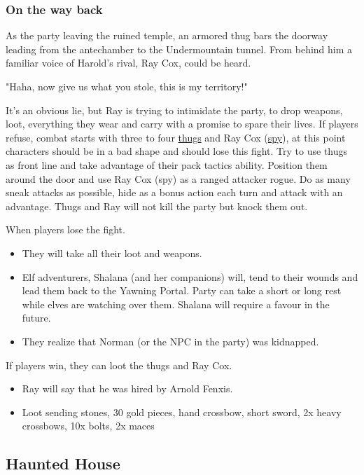 \documentclass[10pt,onecolumn,twoside,openany,bg=full,layout=true]{dndbook}
\begin{document}
\subsubsection{On the way back}
As the party leaving the ruined temple, an armored thug bars the doorway leading from the antechamber to the Undermountain tunnel.
From behind him a familiar voice of Harold's rival, Ray Cox, could be heard.
\begin{DndReadAloud}
"Haha, now give us what you stole, this is my territory!"
\end{DndReadAloud}
It's an obvious lie, but Ray is trying to intimidate the party, to drop weapons, loot, everything they wear and carry with a promise to spare their lives.
If players refuse, combat starts with three to four \href{https://www.dndbeyond.com/monsters/17035-thug}{thugs} and
Ray Cox (\href{https://www.dndbeyond.com/monsters/17021-spy}{spy}), at this point characters should be in a bad shape and should lose this fight.
Try to use thugs as front line and take advantage of their pack tactics ability.
Position them around the door and use Ray Cox (spy) as a ranged attacker rogue.
Do as many sneak attacks as possible, hide as a bonus action each turn and attack with an advantage.
Thugs and Ray will not kill the party but knock them out.

When players lose the fight.
\begin{itemize}
  \item They will take all their loot and weapons.
  \item Elf adventurers, Shalana (and her companions) will, tend to their wounds and lead them back to the Yawning Portal.
  Party can take a short or long rest while elves are watching over them.
  Shalana will require a favour in the future.
  \item They realize that Norman (or the NPC in the party) was kidnapped.
\end{itemize}

If players win, they can loot the thugs and Ray Cox.
\begin{itemize}
  \item Ray will say that he was hired by Arnold Fenxis.
  \item Loot sending stones, 30 gold pieces, hand crossbow, short sword, 2x heavy crossbows, 10x bolts, 2x maces
\end{itemize}



\subsection{Haunted House}\label{subsec:haunted-house}
\lipsum[1]
\end{document}
